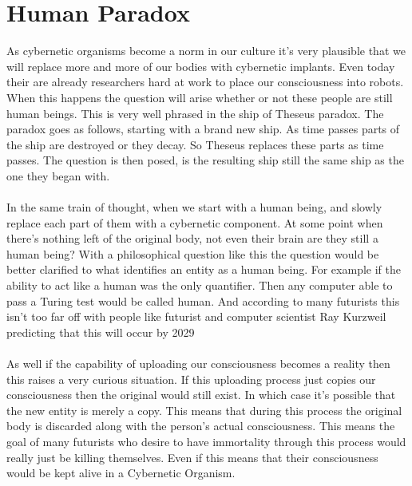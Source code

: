\documentclass[12pt,a4paper,notitlepage]{article}
\begin{document}
\section{Human Paradox}
As cybernetic organisms become a norm in our culture it's very plausible that we
will replace more and more of our bodies with cybernetic implants. Even today
their are already researchers hard at work to place our consciousness into
robots. When this happens the question will arise whether or not these people
are still human beings. This is very well phrased in the ship of Theseus
paradox\cite{Theseus}. The paradox goes as follows, starting with a brand new
ship. As time passes parts of the ship are destroyed or they decay. So Theseus
replaces these parts as time passes. The question is then posed, is the
resulting ship still the same ship as the one they began with. 
\\\\
In the same train of thought, when we start with a human being, and slowly
replace each part of them with a cybernetic component. At some point when
there's nothing left of the original body, not even their brain are they still a
human being? With a philosophical question like this the question would be
better clarified to what identifies an entity as a human being. For example if
the ability to act like a human was the only quantifier. Then any computer able
to pass a Turing test would be called human. And according to many futurists
this isn't too far off with people like futurist and computer scientist Ray
Kurzweil predicting that this will occur by 2029\cite{Kurzweil}
\\\\
As well if the capability of uploading our consciousness becomes a reality then
this raises a very curious situation. If this uploading process just copies our
consciousness then the original would still exist. In which case it's possible
that the new entity is merely a copy. This means that during this process the
original body is discarded along with the person's actual consciousness. This
means the goal of many futurists who desire to have immortality through this
process would really just be killing themselves. Even if this means that their
consciousness would be kept alive in a Cybernetic Organism.
\end{document}
